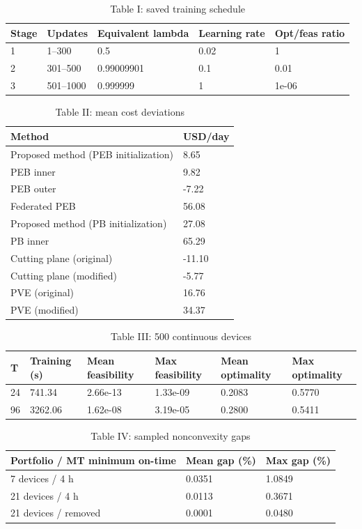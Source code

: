 \begin{table}[htbp]
\centering
\caption{Table I: saved training schedule}
\begin{tabular}{lllll}
\toprule
Stage & Updates & Equivalent lambda & Learning rate & Opt/feas ratio \\
\midrule
1 & 1--300 & 0.5 & 0.02 & 1 \\
2 & 301--500 & 0.99009901 & 0.1 & 0.01 \\
3 & 501--1000 & 0.999999 & 1 & 1e-06 \\
\bottomrule
\end{tabular}
\end{table}

\begin{table}[htbp]
\centering
\caption{Table II: mean cost deviations}
\begin{tabular}{ll}
\toprule
Method & USD/day \\
\midrule
Proposed method (PEB initialization) & 8.65 \\
PEB inner & 9.82 \\
PEB outer & -7.22 \\
Federated PEB & 56.08 \\
Proposed method (PB initialization) & 27.08 \\
PB inner & 65.29 \\
Cutting plane (original) & -11.10 \\
Cutting plane (modified) & -5.77 \\
PVE (original) & 16.76 \\
PVE (modified) & 34.37 \\
\bottomrule
\end{tabular}
\end{table}

\begin{table}[htbp]
\centering
\caption{Table III: 500 continuous devices}
\begin{tabular}{llllll}
\toprule
T & Training (s) & Mean feasibility & Max feasibility & Mean optimality & Max optimality \\
\midrule
24 & 741.34 & 2.66e-13 & 1.33e-09 & 0.2083 & 0.5770 \\
96 & 3262.06 & 1.62e-08 & 3.19e-05 & 0.2800 & 0.5411 \\
\bottomrule
\end{tabular}
\end{table}

\begin{table}[htbp]
\centering
\caption{Table IV: sampled nonconvexity gaps}
\begin{tabular}{lll}
\toprule
Portfolio / MT minimum on-time & Mean gap (\%) & Max gap (\%) \\
\midrule
7 devices / 4 h & 0.0351 & 1.0849 \\
21 devices / 4 h & 0.0113 & 0.3671 \\
21 devices / removed & 0.0001 & 0.0480 \\
\bottomrule
\end{tabular}
\end{table}

